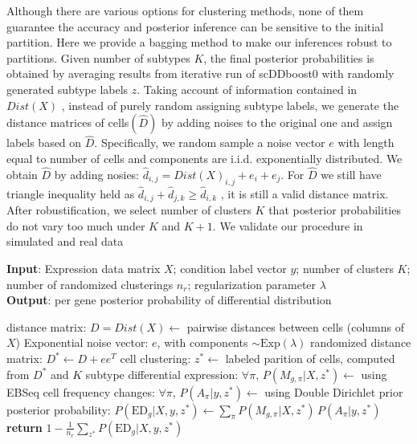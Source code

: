 \documentclass[11pt]{amsart}
\begin{document}
Although there are various options for clustering methods, none of them guarantee the accuracy and posterior inference can be sensitive to the initial partition. Here we provide a bagging method to make our inferences robust to partitions. Given number of subtypes $K$, the final posterior probabilities is obtained by averaging results from iterative run of scDDboost0 with randomly generated subtype labels $\hat z$. Taking account of information contained in $Dist(X)$ , instead of purely random assigning subtype labels, we generate the distance matrices of cells$(\hat D)$ by adding noises to the original one and assign labels based on $\hat D$. Specifically,  we random sample a noise vector $e$ with length equal to number of cells and components are i.i.d. exponentially distributed. We obtain $\hat{D}$ by adding nosies: $\hat{d}_{i,j} = Dist(X)_{i,j} + e_i  + e_j$. For $\hat{D}$ we still have triangle inequality held as $\hat{d}_{i,j} + \hat{d}_{j,k} \geq \hat{d}_{i,k}$ , it is still a valid distance matrix.
After robustification, we select number of clusters $K$ that posterior probabilities do not vary too much under $K$ and $K+1$.  We validate our procedure in simulated and real data


\begin{algorithm}
\caption{}\label{alg:scDDboost-robust}
\raggedright\hspace*{\algorithmicindent} 
\textbf{Input}: Expression data matrix $X$; condition label vector $y$; number of clusters $K$; \\
\hspace*{\algorithmicindent} number of randomized clusterings $n_r$; regularization parameter $\lambda$   
\\
\hspace*{\algorithmicindent} \textbf{Output}: per gene posterior probability of differential distribution 
\begin{algorithmic}[2]
\State distance matrix: $D=Dist(X) \gets$ pairwise distances between cells (columns of $X$)
\Repeat
\State Exponential noise vector: $e$, with components $\sim \text{Exp}(\lambda)$
\State randomized distance matrix: $D^* \gets D + e e^T$
\State cell clustering: $z^* \gets$ labeled parition of cells, computed from $D^*$ and $K$
\State subtype differential expression: $\forall \pi$,  $P(M_{g,\pi} | X, z^*)\gets$ using EBSeq\cite{ref:Leng}
\State cell frequency changes: $\forall \pi$, $P(A_\pi | y, z^*)\gets$ using Double Dirichlet prior
\State posterior probability: $P(\text{ED}_g | X, y, z^*)\gets \underset{\pi}{\sum}P(M_{g,\pi} | X, z^*) \,
 P(A_\pi | y, z^*)$
\State \textbf{return} $1-\frac{1}{n_r} \sum_{z^*} P(\text{ED}_g |X, y,z^*)$
\EndProcedure
\end{algorithmic}
\end{algorithm}
\end{document}
